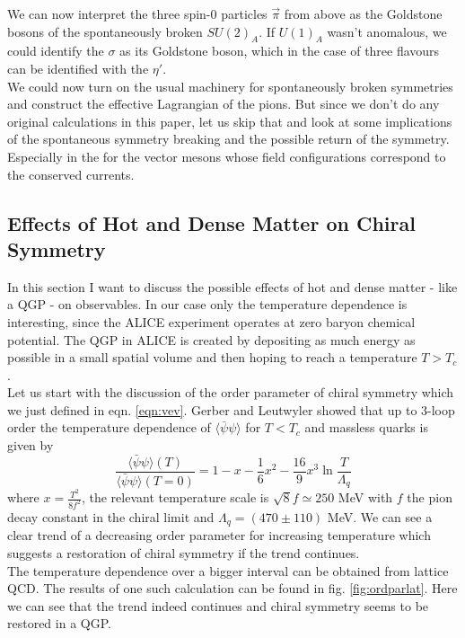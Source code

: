 We can now interpret the three spin-0 particles $\vec{\pi}$ from above as the Goldstone bosons of the spontaneously broken $SU(2)_A$. If $U(1)_A$ wasn't anomalous, we could identify the $\sigma$ as its Goldstone boson, which in the case of three flavours can be identified with the $\eta'$. \\
We could now turn on the usual machinery for spontaneously broken symmetries and construct the effective Lagrangian of the pions. But since we don't do any original calculations in this paper, let us skip that and look at some implications of the spontaneous symmetry breaking and the possible return of the symmetry. Especially in the for the vector mesons whose field configurations correspond to the conserved currents.

\subsection{Effects of Hot and Dense Matter on Chiral Symmetry}
In this section I want to discuss the possible effects of hot and dense matter - like a QGP - on observables. In our case only the temperature dependence is interesting, since the ALICE experiment operates at zero baryon chemical potential. The QGP in ALICE is created by depositing as much energy as possible in a small spatial volume and then hoping to reach a temperature $T > T_c$. \\
Let us start with the discussion of the order parameter of chiral symmetry which we just defined in eqn. \ref{eqn:vev}. Gerber and Leutwyler showed that up to 3-loop order the temperature dependence of $\langle \bar{\psi} \psi \rangle$ for $T < T_c$ and massless quarks is given by \cite{OrdPar3loop}
\begin{equation}
\frac{\langle \bar{\psi} \psi \rangle(T)}{\langle \bar{\psi} \psi \rangle(T=0)} = 1 - x - \frac{1}{6} x^2 - \frac{16}{9} x^3 \ln \frac{T}{\Lambda_q}
\end{equation}
where $x = \frac{T^2}{8f^2}$, the relevant temperature scale is $\sqrt{8}f \simeq 250$ MeV with $f$ the pion decay constant in the chiral limit and $\Lambda_q = (470 \pm 110)$ MeV. We can see a clear trend of a decreasing order parameter for increasing temperature which suggests a restoration of chiral symmetry if the trend continues. \\
The temperature dependence over a bigger interval can be obtained from lattice QCD. The results of one such calculation can be found in fig. \ref{fig:ordparlat}. Here we can see that the trend indeed continues and chiral symmetry seems to be restored in a QGP.
